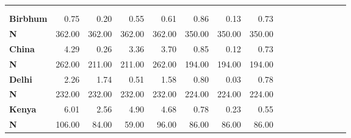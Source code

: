 \begin{tabular}{@{\extracolsep{5pt}}lrrrrrrrrrrrrrrr}
\toprule
&  &  &  &  &  &  &  \\
{\bf } &  &  &  &  &  &  &  \\
\hline
{\bf Birbhum} & 0.75\phantom{***} & 0.20\phantom{***} & 0.55\phantom{***} & 0.61\phantom{***} & 0.86\phantom{***} & 0.13\phantom{***} & 0.73\phantom{***} \\
{\bf N} & 362.00\phantom{***} & 362.00\phantom{***} & 362.00\phantom{***} & 362.00\phantom{***} & 350.00\phantom{***} & 350.00\phantom{***} & 350.00\phantom{***} \\
{\bf China} & 4.29\phantom{***} & 0.26\phantom{***} & 3.36\phantom{***} & 3.70\phantom{***} & 0.85\phantom{***} & 0.12\phantom{***} & 0.73\phantom{***} \\
{\bf N} & 262.00\phantom{***} & 211.00\phantom{***} & 211.00\phantom{***} & 262.00\phantom{***} & 194.00\phantom{***} & 194.00\phantom{***} & 194.00\phantom{***} \\
{\bf Delhi} & 2.26\phantom{***} & 1.74\phantom{***} & 0.51\phantom{***} & 1.58\phantom{***} & 0.80\phantom{***} & 0.03\phantom{***} & 0.78\phantom{***} \\
{\bf N} & 232.00\phantom{***} & 232.00\phantom{***} & 232.00\phantom{***} & 232.00\phantom{***} & 224.00\phantom{***} & 224.00\phantom{***} & 224.00\phantom{***} \\
{\bf Kenya} & 6.01\phantom{***} & 2.56\phantom{***} & 4.90\phantom{***} & 4.68\phantom{***} & 0.78\phantom{***} & 0.23\phantom{***} & 0.55\phantom{***} \\
{\bf N} & 106.00\phantom{***} & 84.00\phantom{***} & 59.00\phantom{***} & 96.00\phantom{***} & 86.00\phantom{***} & 86.00\phantom{***} & 86.00\phantom{***} \\

\end{tabular}
